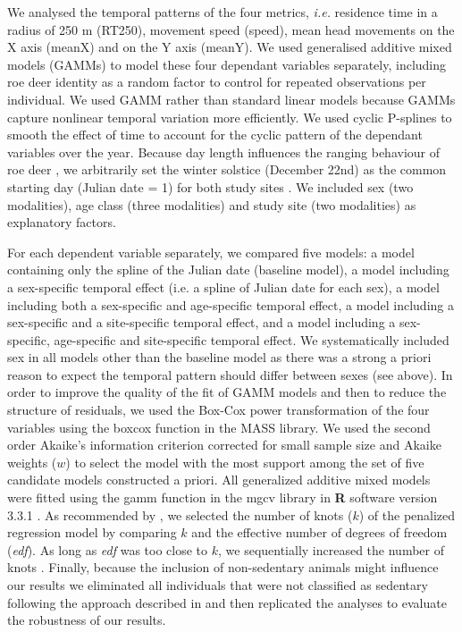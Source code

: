 \documentclass[a4paper,11pt]{article}
\begin{document}
We analysed the temporal patterns of the four metrics, \textit{i.e.}
residence time in a radius of 250 m (RT250), movement speed (speed),
mean head movements on the X axis (meanX) and on the Y axis
(meanY). We used generalised additive mixed models (GAMMs) to model
these four dependant variables separately, including roe deer identity
as a random factor to control for repeated observations per
individual. We used GAMM rather than standard linear models because
GAMMs capture nonlinear temporal variation more efficiently. We used
cyclic P-splines to smooth the effect of time to account for the
cyclic pattern of the dependant variables over the year. Because day
length influences the ranging behaviour of roe deer
\citep{borger_integrated_2006}, we arbitrarily set the winter solstice
(December 22nd) as the common starting day (Julian date = 1) for both
study sites \cite[see also][]{morellet_seasonality_2013}. We included
sex (two modalities), age class (three modalities) and study site (two
modalities) as explanatory factors.

For each dependent variable separately, we compared five models: a
model containing only the spline of the Julian date (baseline model),
a model including a sex-specific temporal effect (i.e. a spline of
Julian date for each sex), a model including both a sex-specific and
age-specific temporal effect, a model including a sex-specific and a
site-specific temporal effect, and a model including a sex-specific,
age-specific and site-specific temporal effect. We systematically
included sex in all models other than the baseline model as there was
a strong a priori reason to expect the temporal pattern should differ
between sexes (see above). In order to improve the quality of the fit
of GAMM models and then to reduce the structure of residuals, we used
the Box-Cox power transformation of the four variables using the
boxcox function in the \textsf{MASS} library. We used the second order
Akaike’s information criterion corrected for small sample size
\citep[AICc,][]{burnham_model_1998} and Akaike weights ($w$) to select
the model with the most support among the set of five candidate models
constructed a priori. All generalized additive mixed models were
fitted using the \textsf{gamm} function in the \textsf{mgcv} library
\cite{wood_generalized_2006} in \textbf{\textsf{R}} software version
3.3.1 \citep{r_core_team_r:_2016}. As recommended by \cite{Wood2017}, we
selected the number of knots ($k$) of the penalized regression model
by comparing $k$ and the effective number of degrees of freedom
(\textit{edf}). As long as \textit{edf} was too close to $k$, we
sequentially increased the number of knots \citep{Wood2017}. Finally,
because the inclusion of non-sedentary animals might influence our
results we eliminated all individuals that were not classified as
sedentary following the approach described in
\cite{cagnacci_partial_2011} and then replicated the analyses to
evaluate the robustness of our results.
\end{document}
